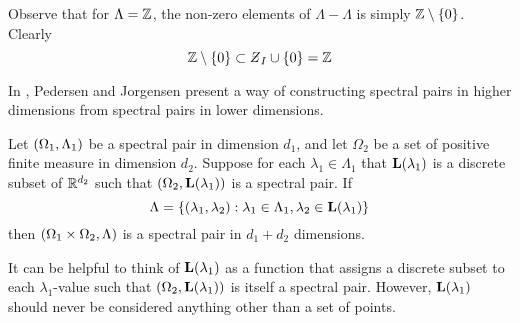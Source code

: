 \documentclass[../thesis.tex]{subfiles}
\begin{document}
\begin{example}
    Observe that for $\Lambda=\mathbb{Z}$, the non-zero elements of $\Lambda - \Lambda$ is simply $\mathbb{Z}\setminus\{0\}$. Clearly
    \begin{equation*}
        \intnozero \subset \Zstroke_{I} \cup \braq{0} = \Z
    \end{equation*}
\end{example}



In \cite{jorgensenSpectralPairsCartesian2001}, Pedersen and Jorgensen present a way of constructing spectral pairs in higher dimensions from spectral pairs in lower dimensions. 

\begin{theorem}\label{thrm:construction_spectra}
    Let $(\Omega_1,\Lambda_1)$ be a spectral pair in dimension $d_1$, and let $\Omega_2$ be a set of positive finite measure in dimension $d_2$. Suppose for each $\lambda_1 \in \Lambda_1$ that $\mathbf{L}(\lambda_1)$ is a discrete subset of $\mathbb{R}^{d_2}$ such that $(\Omega_2,\mathbf{L}(\lambda_1))$ is a spectral pair. If 
    \begin{equation*}
        \Lambda = \{(\lambda_1, \lambda_2): \lambda_1\in \Lambda_1, \lambda_2 \in \mathbf{L}(\lambda_1)\} 
    \end{equation*}
    then $(\Omega_1\times\Omega_2, \Lambda)$ is a spectral pair in $d_1+d_2$ dimensions. 
\end{theorem}

\begin{remark}
    It can be helpful to think of $\mathbf{L}(\lambda_1)$ as a function that assigns a discrete subset to each $\lambda_1$-value such that $(\Omega_2,\mathbf{L}(\lambda_1))$ is itself a spectral pair. However, $\mathbf{L}(\lambda_1)$ should never be considered anything other than a set of points. 
\end{remark}
\end{document}
